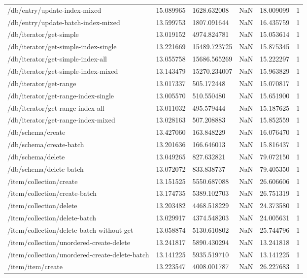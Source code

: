\begin{tabularx}{\linewidth}{XXXXXX}
/db/entry/update-index-mixed & 15.089965 & 1628.632008 & NaN & 18.009099 & 1 \\
/db/entry/update-batch-index-mixed & 13.599753 & 1807.091644 & NaN & 16.435759 & 1 \\
/db/iterator/get-simple & 13.019152 & 4974.824781 & NaN & 15.053614 & 1 \\
/db/iterator/get-simple-index-single & 13.221669 & 15489.723725 & NaN & 15.875345 & 1 \\
/db/iterator/get-simple-index-all & 13.055758 & 15686.565269 & NaN & 15.222297 & 1 \\
/db/iterator/get-simple-index-mixed & 13.143479 & 15270.234007 & NaN & 15.963829 & 1 \\
/db/iterator/get-range & 13.017337 & 505.172448 & NaN & 15.070817 & 1 \\
/db/iterator/get-range-index-single & 13.005570 & 510.550480 & NaN & 15.651900 & 1 \\
/db/iterator/get-range-index-all & 13.011032 & 495.579444 & NaN & 15.187625 & 1 \\
/db/iterator/get-range-index-mixed & 13.028163 & 507.208883 & NaN & 15.852559 & 1 \\
/db/schema/create & 13.427060 & 163.848229 & NaN & 16.076470 & 1 \\
/db/schema/create-batch & 13.201636 & 166.646013 & NaN & 15.816437 & 1 \\
/db/schema/delete & 13.049265 & 827.632821 & NaN & 79.072150 & 1 \\
/db/schema/delete-batch & 13.072072 & 833.838737 & NaN & 79.405350 & 1 \\
/item/collection/create & 13.151525 & 5550.687088 & NaN & 26.606606 & 1 \\
/item/collection/create-batch & 13.174735 & 5389.102703 & NaN & 26.751319 & 1 \\
/item/collection/delete & 13.203482 & 4468.518229 & NaN & 24.373580 & 1 \\
/item/collection/delete-batch & 13.029917 & 4374.548203 & NaN & 24.005631 & 1 \\
/item/collection/delete-batch-without-get & 13.058874 & 5130.610802 & NaN & 25.744796 & 1 \\
/item/collection/unordered-create-delete & 13.241817 & 5890.430294 & NaN & 13.241818 & 1 \\
/item/collection/unordered-create-delete-batch & 13.141225 & 5935.519710 & NaN & 13.141225 & 1 \\
/item/item/create & 13.223547 & 4008.001787 & NaN & 26.227683 & 1 \\

\end{tabularx}
